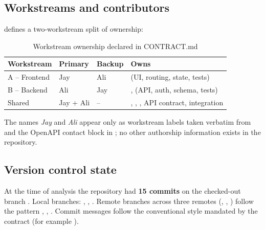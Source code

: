 \subsection{Workstreams and contributors}

 defines a two-workstream split of ownership:

\begin{table}[H]
\centering
\caption{Workstream ownership declared in CONTRACT.md}
\label{tab:workstreams}
\begin{tabular}{@{}L{3.4cm}L{3.6cm}L{3.6cm}L{4.0cm}@{}}
\toprule
\textbf{Workstream} & \textbf{Primary} & \textbf{Backup} & \textbf{Owns} \\
\midrule
A -- Frontend & Jay & Ali &  (UI, routing, state, tests) \\
B -- Backend & Ali & Jay & ,  (API, auth, schema, tests) \\
Shared & Jay + Ali & -- & , , , API contract, integration \\
\bottomrule
\end{tabular}
\end{table}

\noindent The names \emph{Jay} and \emph{Ali} appear only as workstream labels taken verbatim from  and the OpenAPI contact block in ; no other authorship information exists in the repository.

\subsection{Version control state}

At the time of analysis the repository had \textbf{15 commits} on the checked-out branch . Local branches: , , . Remote branches across three remotes (, , ) follow the pattern , , . Commit messages follow the conventional style mandated by the contract (for example ). 

